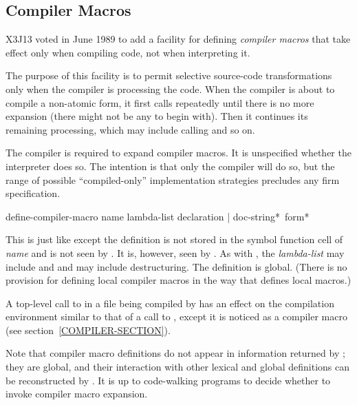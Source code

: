 \begin{newer}
\section{Compiler Macros}

X3J13 voted in June 1989 
to add a facility for defining {\it compiler macros} that
take effect only when compiling code, not when interpreting it.

The purpose of this facility is to permit selective source-code
transformations only when the compiler is processing the code.
When the compiler is about to compile a non-atomic form, it first calls
 repeatedly until there is no more expansion
(there might not be any to begin with).  Then it continues its
remaining processing, which may include calling  and so on.

The compiler is required to expand compiler macros.  It is unspecified
whether the interpreter does so.  The intention is that only the
compiler will do so, but the range of possible ``compiled-only''
implementation strategies precludes any firm specification.


\begin{defmac}
define-compiler-macro name lambda-list
                      {declaration | doc-string}* {\,form}*

  This is just like  except the definition is not stored in the
  symbol function cell of {\it name} and is not seen by .
  It is, however, seen by .  As with , the
  {\it lambda-list} may include  and 
  and may include destructuring.  The definition is
  global.  (There is no provision for defining local compiler
  macros in the way that  defines local macros.)

  A top-level call to  in a file being compiled by
   has an effect on the compilation environment similar to
  that of a call to , except it is noticed as a
  compiler macro (see section~\ref{COMPILER-SECTION}).

Note that compiler macro definitions do not appear in information returned by
; they are global, and their interaction
with other lexical and global definitions can be reconstructed by
.  It is up to code-walking programs to decide
whether to invoke compiler macro expansion.



\end{defmac}
\end{newer}
